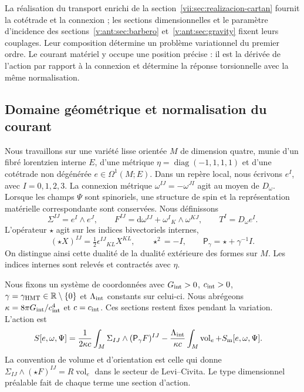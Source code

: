 La réalisation du transport enrichi de la
section~\ref{vii:sec:realizacion-cartan} fournit la cotétrade et la
connexion ; les sections dimensionnelles et le paramètre d'incidence des
sections~\ref{v:ant:sec:barbero} et~\ref{v:ant:sec:gravity} fixent leurs couplages. Leur composition
détermine un problème variationnel du premier ordre. Le courant matériel
y occupe une position précise : il est la dérivée de l'action par rapport à
la connexion et détermine la réponse torsionnelle avec la même normalisation.

\subsection{Domaine géométrique et normalisation du courant}
\label{vii:subsec:dominio-corriente-cartan}

Nous travaillons sur une variété lisse orientée \(M\) de dimension quatre, munie d'un fibré lorentzien interne \(E\), d'une métrique \(\eta=\operatorname{diag}(-1,1,1,1)\) et d'une cotétrade non dégénérée \(e\in\Omega^1(M;E)\). Dans un repère local, nous écrivons \(e^I\), avec \(I=0,1,2,3\). La connexion métrique \(\omega^{IJ}=-\omega^{JI}\) agit au moyen de \(D_\omega\). Lorsque les champs \(\Psi\) sont spinoriels, une structure de spin et la représentation matérielle correspondante sont conservées. Nous définissons
\begin{equation}
 \Sigma^{IJ}=e^I\wedge e^J,\qquad
 F^{IJ}=\mathrm d\omega^{IJ}+\omega^I{}_{K}\wedge\omega^{KJ},
 \qquad T^I=D_\omega e^I.
 \label{vii:eq:campos-cartan}
\end{equation}
L'opérateur \(\star\) agit sur les indices bivectoriels internes,
\begin{equation}
 (\star X)^{IJ}=\tfrac12\epsilon^{IJ}{}_{KL}X^{KL},
 \qquad \star^2=-I,\qquad
 \mathsf P_\gamma=\star+\gamma^{-1}I.
 \label{vii:eq:operador-holst}
\end{equation}
On distingue ainsi cette dualité de la dualité extérieure des formes sur
\(M\). Les indices internes sont relevés et contractés avec \(\eta\).

Nous fixons un système de coordonnées avec \(G_{\rm int}>0\), \(c_{\rm int}>0\),
\(\gamma=\gamma_{\rm HMT}\in\mathbb R\setminus\{0\}\) et
\(\Lambda_{\rm int}\) constants sur celui-ci. Nous abrégeons
\(\kappa=8\pi G_{\rm int}/c_{\rm int}^4\) et \(c=c_{\rm int}\).
Ces sections restent fixes pendant la variation. L’action est
\begin{equation}
 \begin{split}
 S[e,\omega,\Psi]={}&
 \frac1{2\kappa c}\int_M\Sigma_{IJ}\wedge
                         (\mathsf P_\gamma F)^{IJ}
 -\frac{\Lambda_{\rm int}}{\kappa c}
                         \int_M\operatorname{vol}_e
 +S_{\rm m}[e,\omega,\Psi].
 \end{split}
 \label{vii:eq:accion-cartan-holst}
\end{equation}
La convention de volume et d'orientation est celle qui donne
\(\Sigma_{IJ}\wedge(\star F)^{IJ}=R\operatorname{vol}_e\)
dans le secteur de Levi--Civita. Le type dimensionnel préalable fait de chaque
terme une section d'action.

